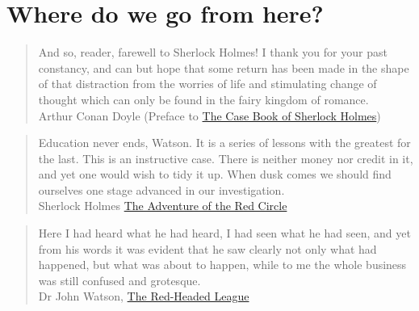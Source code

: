 \documentclass[a4paper,landscape,headrule,footrule,xetex]{foils}
\begin{document}
\maketitle

%
\section{Where do we go from here?}
\begin{quotation}
And so, reader, farewell to Sherlock Holmes! I thank you for your past constancy, and can but hope that some return has been made in the shape of that distraction from the worries of life and stimulating change of thought which can only be found in the fairy kingdom of romance.
\\ \mbox{} \hfill Arthur Conan Doyle (Preface to \href{http://compling.hss.ntu.edu.sg/canon/case.html}{The Case Book of Sherlock Holmes})
\end{quotation}



\begin{quotation}
  Education never ends, Watson. It is a series of lessons with the
  greatest for the last. This is an instructive case. There is neither
  money nor credit in it, and yet one would wish to tidy it up. When
  dusk comes we should find ourselves one stage advanced in our
  investigation. 
\\ \mbox{} \hfill  Sherlock Holmes
\href{http://compling.hss.ntu.edu.sg/canon/redc.html}{The Adventure of the Red Circle} 
\end{quotation}


\begin{quotation}
  Here I had heard what he had heard, I had seen what he had seen,
  and yet from his words it was evident that he saw clearly not only
  what had happened, but what was about to happen, while to me the
  whole business was still confused and grotesque. 
\\ \mbox{} \hfill Dr John Watson, \href{http://compling.hss.ntu.edu.sg/canon/redh.html}{The Red-Headed League}
\end{quotation}
\end{document}
